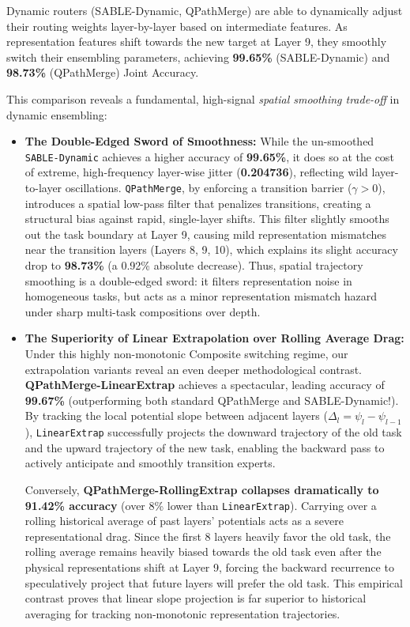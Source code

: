 Dynamic routers (SABLE-Dynamic, QPathMerge) are able to dynamically adjust their routing weights layer-by-layer based on intermediate features. As representation features shift towards the new target at Layer 9, they smoothly switch their ensembling parameters, achieving \textbf{99.65\%} (SABLE-Dynamic) and \textbf{98.73\%} (QPathMerge) Joint Accuracy. 

This comparison reveals a fundamental, high-signal \emph{spatial smoothing trade-off} in dynamic ensembling:
\begin{itemize}
    \item \textbf{The Double-Edged Sword of Smoothness:} While the un-smoothed \texttt{SABLE-Dynamic} achieves a higher accuracy of \textbf{99.65\%}, it does so at the cost of extreme, high-frequency layer-wise jitter (\textbf{0.204736}), reflecting wild layer-to-layer oscillations. \texttt{QPathMerge}, by enforcing a transition barrier ($\gamma > 0$), introduces a spatial low-pass filter that penalizes transitions, creating a structural bias against rapid, single-layer shifts. This filter slightly smooths out the task boundary at Layer 9, causing mild representation mismatches near the transition layers (Layers 8, 9, 10), which explains its slight accuracy drop to \textbf{98.73\%} (a 0.92\% absolute decrease). Thus, spatial trajectory smoothing is a double-edged sword: it filters representation noise in homogeneous tasks, but acts as a minor representation mismatch hazard under sharp multi-task compositions over depth.
    \item \textbf{The Superiority of Linear Extrapolation over Rolling Average Drag:} Under this highly non-monotonic Composite switching regime, our extrapolation variants reveal an even deeper methodological contrast. \textbf{QPathMerge-LinearExtrap} achieves a spectacular, leading accuracy of \textbf{99.67\%} (outperforming both standard QPathMerge and SABLE-Dynamic!). By tracking the local potential slope between adjacent layers ($\Delta_l = \psi_l - \psi_{l-1}$), \texttt{LinearExtrap} successfully projects the downward trajectory of the old task and the upward trajectory of the new task, enabling the backward pass to actively anticipate and smoothly transition experts. 
    
    Conversely, \textbf{QPathMerge-RollingExtrap collapses dramatically to 91.42\% accuracy} (over 8\% lower than \texttt{LinearExtrap}). Carrying over a rolling historical average of past layers' potentials acts as a severe representational drag. Since the first 8 layers heavily favor the old task, the rolling average remains heavily biased towards the old task even after the physical representations shift at Layer 9, forcing the backward recurrence to speculatively project that future layers will prefer the old task. This empirical contrast proves that linear slope projection is far superior to historical averaging for tracking non-monotonic representation trajectories.
\end{itemize}

